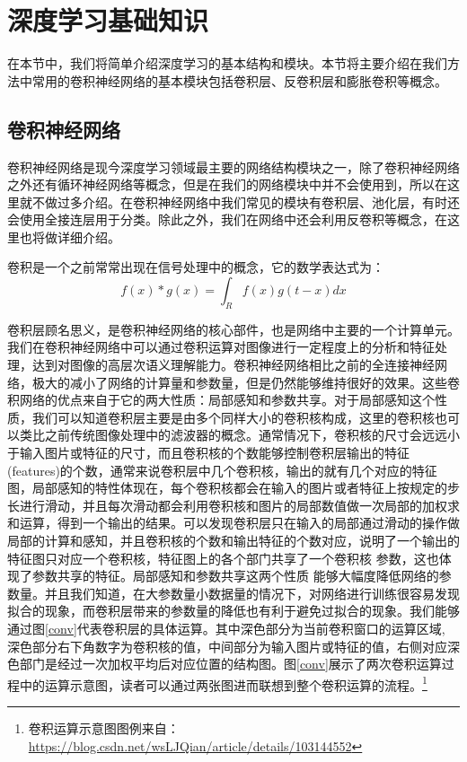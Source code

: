 \documentclass[master]{thesis-uestc}
\begin{document}
\section{深度学习基础知识}
在本节中，我们将简单介绍深度学习的基本结构和模块。本节将主要介绍在我们方法中常用的卷积神经网络的基本模块包括卷积层、反卷积层和膨胀卷积等概念。

\subsection{卷积神经网络}
卷积神经网络是现今深度学习领域最主要的网络结构模块之一，除了卷积神经网络之外还有循环神经网络等概念，但是在我们的网络模块中并不会使用到，所以在这里就不做过多介绍。在卷积神经网络中我们常见的模块有卷积层、池化层，有时还会使用全接连层用于分类。除此之外，我们在网络中还会利用反卷积等概念，在这里也将做详细介绍。

卷积是一个之前常常出现在信号处理中的概念，它的数学表达式为：
\begin{equation}
    f(x) * g(x) = \int_{R} f(x)g(t - x)dx
\end{equation}

卷积层顾名思义，是卷积神经网络的核心部件，也是网络中主要的一个计算单元。我们在卷积神经网络中可以通过卷积运算对图像进行一定程度上的分析和特征处理，达到对图像的高层次语义理解能力。卷积神经网络相比之前的全连接神经网络，极大的减小了网络的计算量和参数量，但是仍然能够维持很好的效果。这些卷积网络的优点来自于它的两大性质：局部感知和参数共享。对于局部感知这个性质，我们可以知道卷积层主要是由多个同样大小的卷积核构成，这里的卷积核也可以类比之前传统图像处理中的滤波器的概念。通常情况下，卷积核的尺寸会远远小于输入图片或特征的尺寸，而且卷积核的个数能够控制卷积层输出的特征(features)的个数，通常来说卷积层中几个卷积核，输出的就有几个对应的特征图，局部感知的特性体现在，每个卷积核都会在输入的图片或者特征上按规定的步长进行滑动，并且每次滑动都会利用卷积核和图片的局部数值做一次局部的加权求和运算，得到一个输出的结果。可以发现卷积层只在输入的局部通过滑动的操作做局部的计算和感知，并且卷积核的个数和输出特征的个数对应，说明了一个输出的特征图只对应一个卷积核，特征图上的各个部门共享了一个卷积核 参数，这也体现了参数共享的特征。局部感知和参数共享这两个性质 能够大幅度降低网络的参数量。并且我们知道，在大参数量小数据量的情况下，对网络进行训练很容易发现拟合的现象，而卷积层带来的参数量的降低也有利于避免过拟合的现象。我们能够通过图\ref{conv}代表卷积层的具体运算。其中深色部分为当前卷积窗口的运算区域, 深色部分右下角数字为卷积核的值，中间部分为输入图片或特征的值，右侧对应深色部门是经过一次加权平均后对应位置的结构图。图\ref{conv}展示了两次卷积运算过程中的运算示意图，读者可以通过两张图进而联想到整个卷积运算的流程。\footnote{卷积运算示意图图例来自：\url{https://blog.csdn.net/wsLJQian/article/details/103144552}}
\end{document}
